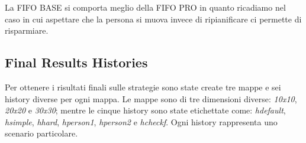 La FIFO BASE si comporta meglio della FIFO PRO in quanto ricadiamo nel caso in cui aspettare che la persona si muova invece di ripianificare ci permette di risparmiare.

\subsection{Final Results Histories}

Per ottenere i risultati finali sulle strategie sono state create tre mappe e sei history diverse per ogni mappa. Le mappe sono di tre dimensioni diverse: \emph{10x10}, \emph{20x20} e \emph{30x30}; mentre le cinque history sono state etichettate come: \emph{hdefault}, \emph{hsimple}, \emph{hhard}, \emph{hperson1}, \emph{hperson2} e \emph{hcheckf}. Ogni history rappresenta uno scenario particolare.

